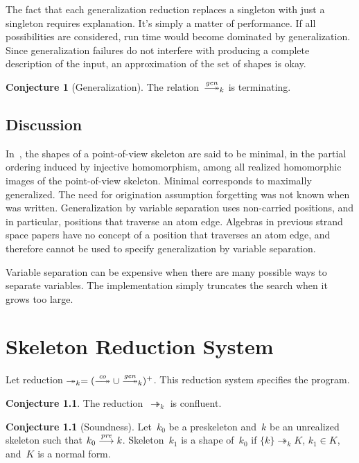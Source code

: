 \documentclass[12pt]{report}
\theoremstyle{definition}
\newtheorem{conj}[thm]{Conjecture}
\begin{document}
The fact that each generalization reduction replaces a singleton with
just a singleton requires explanation.  It's simply a matter of
performance.  If all possibilities are considered, {\cpsa} run time
would become dominated by generalization.  Since generalization
failures do not interfere with producing a complete description of the
input, an approximation of the set of shapes is okay.

\begin{conj}[Generalization]
The relation~$\setreduction{\fn{gen}}_k$ is terminating.
\end{conj}

\section*{Discussion}
In~\cite{DoghmiGuttmanThayer07}, the shapes of a point-of-view
skeleton are said to be minimal, in the partial ordering induced by
injective homomorphism, among all realized homomorphic images of the
point-of-view skeleton.  Minimal corresponds to maximally generalized.
The need for origination assumption forgetting was not known
when~\cite{DoghmiGuttmanThayer07} was written.  Generalization by
variable separation uses non-carried positions, and in particular,
positions that traverse an atom edge.  Algebras in previous strand
space papers have no concept of a position that traverses an atom
edge, and therefore cannot be used to specify generalization by
variable separation.

Variable separation can be expensive when there are many possible ways
to separate variables.  The implementation simply truncates the search
when it grows too large.

\chapter{Skeleton Reduction System}\label{chp:skeleton reduction}

Let reduction
$\twoheadrightarrow_k=(\setreduction{\fn{co}}\cup
\setreduction{\fn{gen}}_k)^+$.  This reduction system specifies the
{\cpsa} program.

\begin{conj}
The reduction~$\twoheadrightarrow_k$ is confluent.
\end{conj}

\begin{conj}[Soundness]\label{cnj:soundness}
Let~$k_0$ be a preskeleton and~$k$ be an unrealized skeleton such that
$k_0\stackrel{\operatorname{\mathit{pre}}}{\longrightarrow}k$.  Skeleton~$k_1$ is a shape of~$k_0$ if
$\{k\}\twoheadrightarrow_k K$, $k_1\in K$, and~$K$ is a normal form.
\end{conj}
\end{document}
